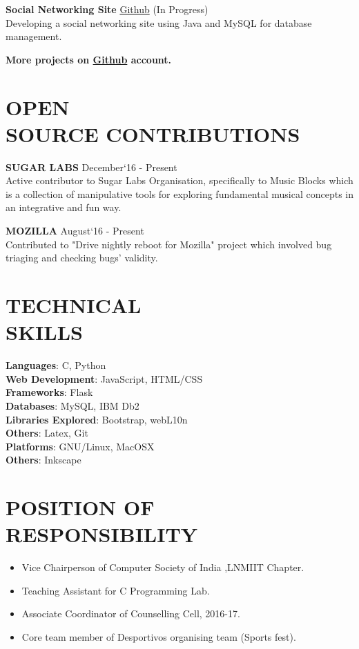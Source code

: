 \documentclass[margin]{res}
\begin{document}
\begin{resume}
  {\textbf{Social Networking Site}} \href{https://github.com/ShubhamSetia/SocialNetworkingSite}{Github} \hfill (In Progress)\\
  Developing a social networking site using Java and MySQL for database management.


  \textbf{More projects on \href{https://github.com/Tabs16}{Github} account.}

\section{OPEN \\ SOURCE CONTRIBUTIONS}
	{\textbf{SUGAR LABS}} \hfill December`16 - Present\\
 	Active contributor to Sugar Labs Organisation, specifically to Music Blocks which is a collection of manipulative tools for exploring fundamental musical concepts in an integrative and fun way.

 	{\textbf{MOZILLA}} \hfill August`16 - Present\\
 	Contributed to "Drive nightly reboot for Mozilla" project which involved bug triaging and checking bugs' validity.
 	




\section{TECHNICAL \\ SKILLS}

  {\textbf{Languages}:} C, Python\\
  {\textbf{Web Development}:} JavaScript, HTML/CSS\\
  {\textbf{Frameworks}:} Flask\\
  {\textbf{Databases}:} MySQL, IBM Db2\\
  {\textbf{Libraries Explored}:} Bootstrap, webL10n\\
  {\textbf{Others}:} Latex, Git\\
  {\textbf{Platforms}:} GNU/Linux, MacOSX\\
  {\textbf{Others}:} Inkscape\\

\section{POSITION OF RESPONSIBILITY }
	\begin{itemize}
		\item Vice Chairperson of Computer Society of India ,LNMIIT Chapter.
		\item Teaching Assistant for C Programming Lab. 
		\item Associate Coordinator of Counselling Cell, 2016-17.	
  		\item Core team member of Desportivos organising team (Sports fest).
	\end{itemize}


\end{resume}
\end{document}
